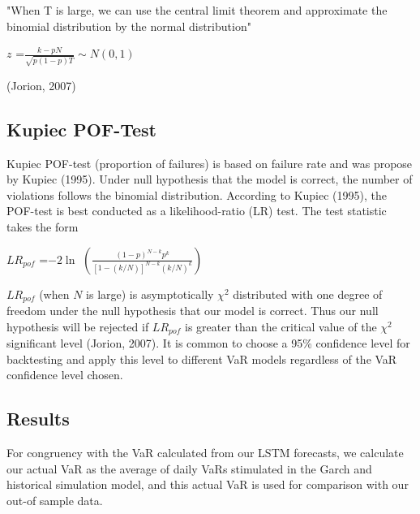 \documentclass[a4paper,11pt,oneside]{book}
\begin{document}
"When T is large, we can use the central limit theorem and approximate the binomial distribution by the normal distribution"
\begin{center}
	$z$ =$\frac{k-pN}{\sqrt{p(1-p)T}}\sim N(0,1)$ 
\end{center}
(Jorion, 2007)

\subsection{Kupiec POF-Test}
Kupiec POF-test (proportion of failures) is based on failure rate and was propose by Kupiec (1995). Under null
hypothesis that the model is correct, the number of violations follows the
binomial distribution. According to Kupiec
(1995), the POF-test is best conducted as a likelihood-ratio (LR) test. The test
statistic takes the form
\begin{center}
	$LR_{pof}$ =$-2\ln$ $\left(\frac{(1-p)^{N-k}p^k}{[1-(k/N)]^{N-k}(k/N)^k}\right)$
\end{center}
$LR_{pof}$ (when $N$ is large) is asymptotically $\chi^2$ distributed with one degree of freedom under the null hypothesis that our model is correct. Thus our null hypothesis will be rejected if $LR_{pof}$ is greater than the critical value of the $\chi^2$ significant level (Jorion, 2007). It is common to choose a 95\% confidence level for backtesting and apply this level to different VaR models regardless of the VaR confidence level chosen.


\subsection{Results}
For congruency with the VaR calculated from our LSTM forecasts, we calculate our actual VaR as the average of daily VaRs stimulated in the Garch and historical simulation model, and this actual VaR is used for comparison with our out-of sample data.









\end{document}
